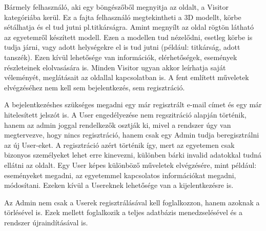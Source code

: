 Bármely felhasználó, aki egy böngészőből megnyitja az oldalt, a Visitor kategóriába kerül. Ez a fajta felhasználó megtekintheti a 3D modellt, körbe sétálhatja és el tud jutni pl.titkárságra. Amint megnyílt az oldal rögtön látható az egyetemről készített modell. Ezen a modellen tud nézelődni, esetleg körbe is tudja járni, vagy adott helységekre el is tud jutni (például: titkárság, adott tanszék). Ezen kívül lehetősége van információk, elérhetőségek, események részleteinek elolvasására is. Minden Visitor ugyan akkor leírhatja saját véleményét, meglátásait az oldallal kapcsolatban is. A fent említett műveletek elvégzéséhez nem kell sem bejelentkezés, sem regisztráció.

A bejelentkezéshes szükséges megadni egy már regisztrált e-mail címet és egy már hitelesített jelszót is. A User engedélyezése nem regszitráció alapján történik, hanem az admin joggal rendelkezők osztják ki, mivel a rendszer úgy van megtervezve, hogy nincs regisztráció, hanem csak egy Admin tudja beregisztrálni az új User-eket. A regisztráció azért történik így, mert az egyetemen csak bizonyos személyeket lehet erre kinevezni, különben bárki invalid adatokkal tudná ellátni az oldalt. Egy User képes különböző műveletek elvégzésére, mint például: eseményeket megadni, az egyetemmel kapcsolatos információkat megadni, módosítani. Ezeken kívül a Usereknek lehetősége van a kijelentkezésre is.

Az Admin nem csak a Userek regisztrálásával kell foglalkozzon, hanem azoknak a törlésével is. Ezek mellett foglalkozik a teljes adatbázis menedzselésével és a rendszer újraindításával is.